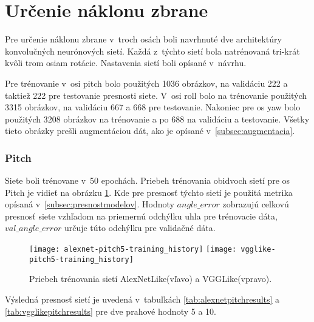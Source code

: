 
\section{Určenie náklonu zbrane}
Pre určenie náklonu zbrane v~troch osách boli navrhnuté dve architektúry konvolučných neurónových sietí.
Každá z~týchto sietí bola natrénovaná tri-krát kvôli trom osiam rotácie.
Nastavenia sietí boli opísané v~návrhu.

Pre trénovanie v~osi pitch bolo použitých 1036 obrázkov, na validáciu 222 a taktiež 222 pre testovanie presnosti siete.
V~osi roll bolo na trénovanie použitých 3315 obrázkov, na validáciu 667 a 668 pre testovanie.
Nakoniec pre os yaw bolo použitých 3208 obrázkov na trénovanie a po 688 na validáciu a testovanie.
Všetky tieto obrázky prešli augmentáciou dát, ako je opísané v~\ref{subsec:augmentacia}.

\subsubsection{Pitch}
Siete boli trénovane v~50 epochách.
Priebeh trénovania obidvoch sietí pre os Pitch je vidieť na obrázku \ref{pic:pitchaxis}.
Kde pre presnosť týchto sietí je použitá metrika opísaná v~\ref{subsec:presnostmodelov}.
Hodnoty $angle\_error$ zobrazujú celkovú presnosť siete vzhľadom na priemernú odchýlku uhla pre trénovacie dáta,
    $val\_angle\_error$ určuje túto odchýlku pre validačné dáta.

\begin{figure}[H]
    \centering
    \texttt{[image: alexnet-pitch5-training\_history]}
	\texttt{[image: vgglike-pitch5-training\_history]}
	\caption{Priebeh trénovania sietí AlexNetLike(vľavo) a VGGLike(vpravo).}
	\label{pic:pitchaxis}
\end{figure}

Výsledná presnosť sietí je uvedená v~tabuľkách \ref{tab:alexnetpitchresults} a \ref{tab:vgglikepitchresults} pre dve prahové hodnoty 5 a 10.

